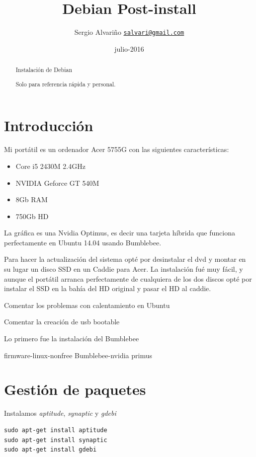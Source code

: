 \documentclass[12pt,spanish,]{article}
\title{Debian Post-install}
\author{Sergio Alvariño
\href{mailto:salvari@gmail.com}{\nolinkurl{salvari@gmail.com}}}
\date{julio-2016}
\begin{document}
\maketitle
\begin{abstract}
Instalación de Debian

Solo para referencia rápida y personal.
\end{abstract}

{
\hypersetup{linkcolor=black}
\setcounter{tocdepth}{3}
\tableofcontents
}
\section{Introducción}\label{introducciuxf3n}

Mi portátil es un ordenador Acer 5755G con las siguientes
características:

\begin{itemize}
\item
  Core i5 2430M 2.4GHz
\item
  NVIDIA Geforce GT 540M
\item
  8Gb RAM
\item
  750Gb HD
\end{itemize}

La gráfica es una Nvidia Optimus, es decir una tarjeta híbrida que
funciona perfectamente en Ubuntu 14.04 usando Bumblebee.

Para hacer la actualización del sistema opté por desinstalar el dvd y
montar en su lugar un disco SSD en un Caddie para Acer. La instalación
fué muy fácil, y aunque el portátil arranca perfectamente de cualquiera
de los dos discos opté por instalar el SSD en la bahía del HD original y
pasar el HD al caddie.

Comentar los problemas con calentamiento en Ubuntu

Comentar la creación de usb bootable

Lo primero fue la instalación del Bumblebee

firmware-linux-nonfree Bumblebee-nvidia primus

\section{Gestión de paquetes}\label{gestiuxf3n-de-paquetes}

Instalamos \emph{aptitude}, \emph{synaptic} y \emph{gdebi}

\begin{verbatim}
sudo apt-get install aptitude
sudo apt-get install synaptic
sudo apt-get install gdebi
\end{verbatim}
\end{document}
